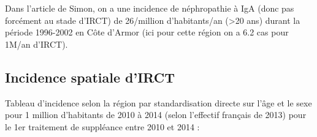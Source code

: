 \documentclass[11pt,a4paper]{article}\usepackage[]{graphicx}\usepackage[]{color}
\begin{document}
Dans l'article de Simon, on a une incidence de néphropathie à IgA (donc pas forcément au stade d'IRCT) de 26/million d'habitants/an (\textgreater 20 ans) durant la période 1996-2002 en Côte d'Armor (ici pour cette région on a 6.2 cas pour 1M/an d'IRCT). %

  \subsection{Incidence spatiale d'IRCT}

Tableau d'incidence selon la région par standardisation directe sur l'âge et le sexe pour 1 million d'habitants de 2010 à 2014 (selon l'effectif français de 2013) pour le 1er traitement de suppléance entre 2010 et 2014 :
\end{document}
